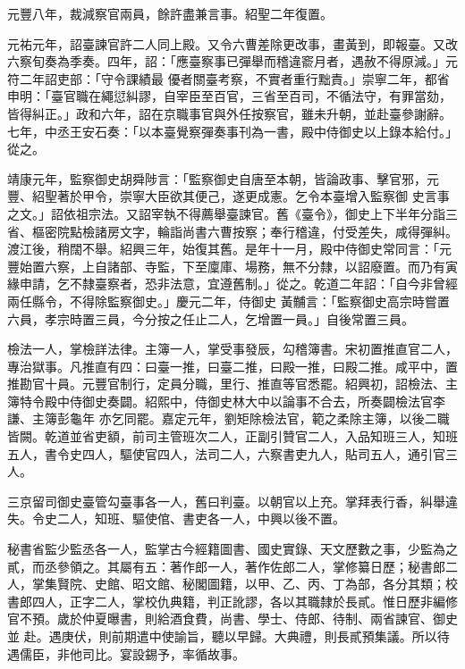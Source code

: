 \begin{pinyinscope}
 元豐八年，裁減察官兩員，餘許盡兼言事。紹聖二年復置。



 元祐元年，詔臺諫官許二人同上殿。又令六曹差除更改事，畫黃到，即報臺。又改六察旬奏為季奏。四年，詔：「應臺察事已彈舉而稽違窬月者，遇赦不得原減。」元符二年詔吏部：「守令課績最
 優者關臺考察，不實者重行黜責。」崇寧二年，都省申明：「臺官職在繩愆糾謬，自宰臣至百官，三省至百司，不循法守，有罪當劾，皆得糾正。」政和六年，詔在京職事官與外任按察官，雖未升朝，並赴臺參謝辭。七年，中丞王安石奏：「以本臺覺察彈奏事刊為一書，殿中侍御史以上錄本給付。」從之。



 靖康元年，監察御史胡舜陟言：「監察御史自唐至本朝，皆論政事、擊官邪，元豐、紹聖著於甲令，崇寧大臣欲其便己，遂更成憲。乞令本臺增入監察御
 史言事之文。」詔依祖宗法。又詔宰執不得薦舉臺諫官。舊《臺令》，御史上下半年分詣三省、樞密院點檢諸房文字，輪詣尚書六曹按察；奉行稽違，付受差失，咸得彈糾。渡江後，稍闊不舉。紹興三年，始復其舊。是年十一月，殿中侍御史常同言：「元豐始置六察，上自諸部、寺監，下至廩庫、場務，無不分隸，以詔廢置。而乃有寅緣申請，乞不隸臺察者，恐非法意，宜遵舊制。」從之。乾道二年詔：「自今非曾經兩任縣令，不得除監察御史。」慶元二年，侍御史
 黃黼言：「監察御史高宗時嘗置六員，孝宗時置三員，今分按之任止二人，乞增置一員。」自後常置三員。



 檢法一人，掌檢詳法律。主簿一人，掌受事發辰，勾稽簿書。宋初置推直官二人，專治獄事。凡推直有四：曰臺一推，曰臺二推，曰殿一推，曰殿二推。咸平中，置推勘官十員。元豐官制行，定員分職，里行、推直等官悉罷。紹興初，詔檢法、主簿特令殿中侍御史奏闢。紹熙中，侍御史林大中以論事不合去，所奏闢檢法官李謙、主簿彭龜年
 亦乞同罷。嘉定元年，劉矩除檢法官，範之柔除主簿，以後二職皆闕。乾道並省吏額，前司主管班次二人，正副引贊官二人，入品知班三人，知班五人，書令史四人，驅使官四人，法司二人，六察書吏九人，貼司五人，通引官三人。



 三京留司御史臺管勾臺事各一人，舊曰判臺。以朝官以上充。掌拜表行香，糾舉違失。令史二人，知班、驅使倌、書吏各一人，中興以後不置。



 秘書省監少監丞各一人，監掌古今經籍圖書、國史實錄、天文歷數之事，少監為之貳，而丞參領之。其屬有五：著作郎一人，著作佐郎二人，掌修纂日歷；秘書郎二人，掌集賢院、史館、昭文館、秘閣圖籍，以甲、乙、丙、丁為部，各分其類；校書郎四人，正字二人，掌校仇典籍，判正訛謬，各以其職隸於長貳。惟日歷非編修官不預。歲於仲夏曝書，則給酒食費，尚書、學士、侍郎、待制、兩省諫官、御史並
 赴。遇庚伏，則前期遣中使諭旨，聽以早歸。大典禮，則長貳預集議。所以待遇儒臣，非他司比。宴設錫予，率循故事。




\end{pinyinscope}
